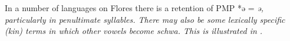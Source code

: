 %
%
%

In a number of languages on Flores there is a retention of PMP
*ə = \it{ə}, particularly in penultimate syllables.
There may also be some lexically specific (kin) terms in which
other vowels become schwa.
This is illustrated in .

